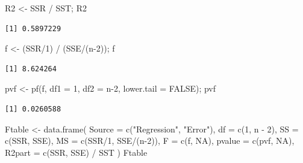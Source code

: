 \documentclass[
  letterpaper,
]{scrbook}
\newenvironment{Shaded}{\begin{snugshade}}{\end{snugshade}}
\newcommand{\AttributeTok}[1]{\textcolor[rgb]{0.40,0.45,0.13}{#1}}
\newcommand{\ConstantTok}[1]{\textcolor[rgb]{0.56,0.35,0.01}{#1}}
\newcommand{\DecValTok}[1]{\textcolor[rgb]{0.68,0.00,0.00}{#1}}
\newcommand{\FunctionTok}[1]{\textcolor[rgb]{0.28,0.35,0.67}{#1}}
\newcommand{\NormalTok}[1]{\textcolor[rgb]{0.00,0.23,0.31}{#1}}
\newcommand{\OtherTok}[1]{\textcolor[rgb]{0.00,0.23,0.31}{#1}}
\newcommand{\SpecialCharTok}[1]{\textcolor[rgb]{0.37,0.37,0.37}{#1}}
\newcommand{\StringTok}[1]{\textcolor[rgb]{0.13,0.47,0.30}{#1}}
\begin{document}
\begin{Shaded}
\begin{Highlighting}[]
\NormalTok{R2 }\OtherTok{\textless{}{-}}\NormalTok{ SSR }\SpecialCharTok{/}\NormalTok{ SST; R2}
\end{Highlighting}
\end{Shaded}

\begin{verbatim}
[1] 0.5897229
\end{verbatim}

\begin{Shaded}
\begin{Highlighting}[]
\NormalTok{f  }\OtherTok{\textless{}{-}}\NormalTok{ (SSR}\SpecialCharTok{/}\DecValTok{1}\NormalTok{) }\SpecialCharTok{/}\NormalTok{ (SSE}\SpecialCharTok{/}\NormalTok{(n}\DecValTok{{-}2}\NormalTok{)); f}
\end{Highlighting}
\end{Shaded}

\begin{verbatim}
[1] 8.624264
\end{verbatim}

\begin{Shaded}
\begin{Highlighting}[]
\NormalTok{pvf }\OtherTok{\textless{}{-}} \FunctionTok{pf}\NormalTok{(f, }\AttributeTok{df1 =} \DecValTok{1}\NormalTok{, }\AttributeTok{df2 =}\NormalTok{ n}\DecValTok{{-}2}\NormalTok{, }\AttributeTok{lower.tail =} \ConstantTok{FALSE}\NormalTok{); pvf}
\end{Highlighting}
\end{Shaded}

\begin{verbatim}
[1] 0.0260588
\end{verbatim}

\begin{Shaded}
\begin{Highlighting}[]
\NormalTok{Ftable }\OtherTok{\textless{}{-}} \FunctionTok{data.frame}\NormalTok{(}
  \AttributeTok{Source =} \FunctionTok{c}\NormalTok{(}\StringTok{"Regression"}\NormalTok{, }\StringTok{"Error"}\NormalTok{),}
  \AttributeTok{df     =} \FunctionTok{c}\NormalTok{(}\DecValTok{1}\NormalTok{, n }\SpecialCharTok{{-}} \DecValTok{2}\NormalTok{),}
  \AttributeTok{SS     =} \FunctionTok{c}\NormalTok{(SSR, SSE),}
  \AttributeTok{MS     =} \FunctionTok{c}\NormalTok{(SSR}\SpecialCharTok{/}\DecValTok{1}\NormalTok{, SSE}\SpecialCharTok{/}\NormalTok{(n}\DecValTok{{-}2}\NormalTok{)),}
  \AttributeTok{F      =} \FunctionTok{c}\NormalTok{(f, }\ConstantTok{NA}\NormalTok{),}
  \AttributeTok{pvalue =} \FunctionTok{c}\NormalTok{(pvf, }\ConstantTok{NA}\NormalTok{),}
  \AttributeTok{R2part =} \FunctionTok{c}\NormalTok{(SSR, SSE) }\SpecialCharTok{/}\NormalTok{ SST}
\NormalTok{)}
\NormalTok{Ftable}
\end{Highlighting}
\end{Shaded}
\end{document}
